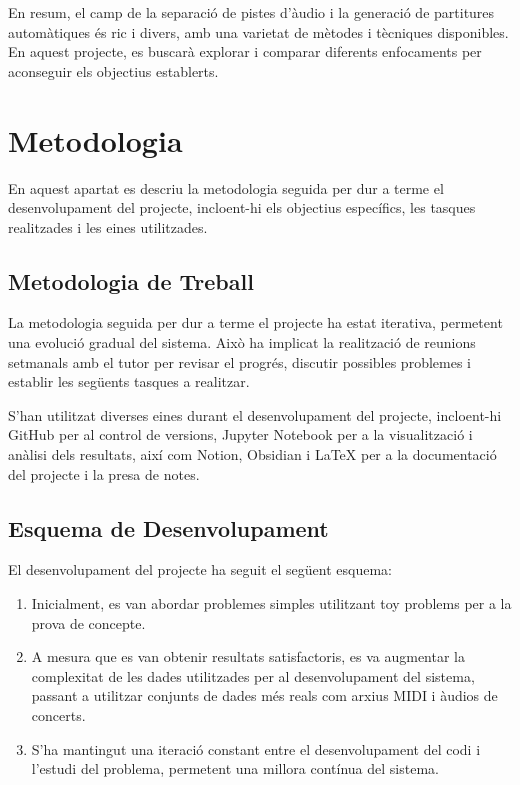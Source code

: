 ﻿\documentclass[10pt,a4paper,twocolumn,twoside]{article}
\begin{document}
En resum, el camp de la separació de pistes d'àudio i la generació de partitures automàtiques és ric i divers, amb una varietat de mètodes i tècniques disponibles. En aquest projecte, es buscarà explorar i comparar diferents enfocaments per aconseguir els objectius establerts.


\section{Metodologia}
\label{sec:metodologia}

En aquest apartat es descriu la metodologia seguida per dur a terme el desenvolupament del projecte, incloent-hi els objectius específics, les tasques realitzades i les eines utilitzades.


\subsection{Metodologia de Treball}
\label{subsec-metodologia}

La metodologia seguida per dur a terme el projecte ha estat iterativa, permetent una evolució gradual del sistema. Això ha implicat la realització de reunions setmanals amb el tutor per revisar el progrés, discutir possibles problemes i establir les següents tasques a realitzar.

S'han utilitzat diverses eines durant el desenvolupament del projecte, incloent-hi GitHub per al control de versions, Jupyter Notebook per a la visualització i anàlisi dels resultats, així com Notion, Obsidian i LaTeX per a la documentació del projecte i la presa de notes.

\subsection{Esquema de Desenvolupament}
\label{subsec-esquema-desenvolupament}

El desenvolupament del projecte ha seguit el següent esquema:

\begin{enumerate}
    \item Inicialment, es van abordar problemes simples utilitzant toy problems per a la prova de concepte.
    \item A mesura que es van obtenir resultats satisfactoris, es va augmentar la complexitat de les dades utilitzades per al desenvolupament del sistema, passant a utilitzar conjunts de dades més reals com arxius MIDI i àudios de concerts.
    \item S'ha mantingut una iteració constant entre el desenvolupament del codi i l'estudi del problema, permetent una millora contínua del sistema.
\end{enumerate}
\end{document}
